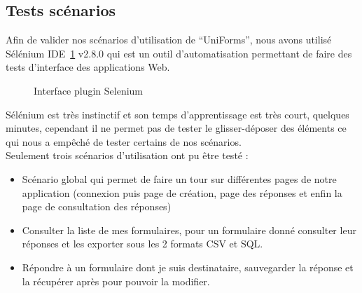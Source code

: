 \documentclass{sigplanconf}
\begin{document}
\subsection{Tests scénarios}
Afin de valider nos scénarios d’utilisation de “UniForms”, nous avons utilisé Sélénium IDE~\ref{selenium} v2.8.0 qui est un outil  d'automatisation permettant de faire des tests d'interface des applications Web.
\begin{figure}
\begin{center}
\end{center}
\caption{Interface plugin Selenium}\label{selenium}
\end{figure}
Sélénium est très instinctif et son temps d’apprentissage est très court, quelques minutes, cependant il ne permet pas de tester le glisser-déposer des éléments ce qui nous a empêché de tester certains de nos scénarios.\\
Seulement trois scénarios d’utilisation ont pu être testé :
\begin{itemize}
\item Scénario global qui permet de faire un tour sur différentes pages de notre application (connexion puis page de création, page des réponses et enfin la page de consultation des réponses)
\item Consulter la liste de mes formulaires, pour un formulaire donné consulter leur réponses et les exporter sous les 2 formats CSV et SQL.
\item Répondre à un formulaire dont je suis destinataire, sauvegarder la réponse et la récupérer après pour pouvoir la modifier.
\end{itemize}
\end{document}
